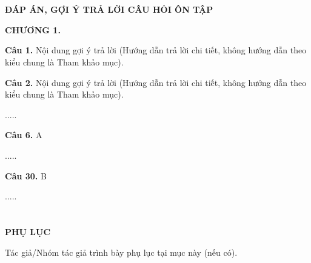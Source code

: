 \newpage
\section*{}
\begin{center}
	\bfseries\fontsize{15}{14}\selectfont
	ĐÁP ÁN, GỢI Ý TRẢ LỜI CÂU HỎI ÔN TẬP
\end{center}

\noindent\textbf{CHƯƠNG 1.}

\noindent\textbf{Câu 1.} Nội dung gợi ý trả lời (Hướng dẫn trả lời chi tiết, không hướng dẫn theo kiểu chung là Tham khảo mục).

\noindent\textbf{Câu 2.} Nội dung gợi ý trả lời (Hướng dẫn trả lời chi tiết, không hướng dẫn theo kiểu chung là Tham khảo mục).

.....

\noindent\textbf{Câu 6.} A

.....

\noindent\textbf{Câu 30.} B

.....

\newpage
\section*{}
\begin{center}
	\bfseries\fontsize{15}{14}\selectfont
	PHỤ LỤC
\end{center}

Tác giả/Nhóm tác giả trình bày phụ lục tại mục này (nếu có).